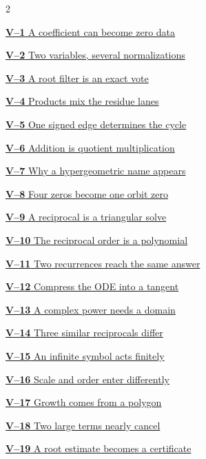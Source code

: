 \documentclass[11pt,a4paper]{article}
\begin{document}
\begin{multicols}{2}
{\small\noindent\hyperlink{vpage1}{\textbf{V--1} A coefficient can become zero data}\par\smallskip}
{\small\noindent\hyperlink{vpage2}{\textbf{V--2} Two variables, several normalizations}\par\smallskip}
{\small\noindent\hyperlink{vpage3}{\textbf{V--3} A root filter is an exact vote}\par\smallskip}
{\small\noindent\hyperlink{vpage4}{\textbf{V--4} Products mix the residue lanes}\par\smallskip}
{\small\noindent\hyperlink{vpage5}{\textbf{V--5} One signed edge determines the cycle}\par\smallskip}
{\small\noindent\hyperlink{vpage6}{\textbf{V--6} Addition is quotient multiplication}\par\smallskip}
{\small\noindent\hyperlink{vpage7}{\textbf{V--7} Why a hypergeometric name appears}\par\smallskip}
{\small\noindent\hyperlink{vpage8}{\textbf{V--8} Four zeros become one orbit zero}\par\smallskip}
{\small\noindent\hyperlink{vpage9}{\textbf{V--9} A reciprocal is a triangular solve}\par\smallskip}
{\small\noindent\hyperlink{vpage10}{\textbf{V--10} The reciprocal order is a polynomial}\par\smallskip}
{\small\noindent\hyperlink{vpage11}{\textbf{V--11} Two recurrences reach the same answer}\par\smallskip}
{\small\noindent\hyperlink{vpage12}{\textbf{V--12} Compress the ODE into a tangent}\par\smallskip}
{\small\noindent\hyperlink{vpage13}{\textbf{V--13} A complex power needs a domain}\par\smallskip}
{\small\noindent\hyperlink{vpage14}{\textbf{V--14} Three similar reciprocals differ}\par\smallskip}
{\small\noindent\hyperlink{vpage15}{\textbf{V--15} An infinite symbol acts finitely}\par\smallskip}
{\small\noindent\hyperlink{vpage16}{\textbf{V--16} Scale and order enter differently}\par\smallskip}
{\small\noindent\hyperlink{vpage17}{\textbf{V--17} Growth comes from a polygon}\par\smallskip}
{\small\noindent\hyperlink{vpage18}{\textbf{V--18} Two large terms nearly cancel}\par\smallskip}
{\small\noindent\hyperlink{vpage19}{\textbf{V--19} A root estimate becomes a certificate}\par\smallskip}

\end{multicols}
\end{document}
